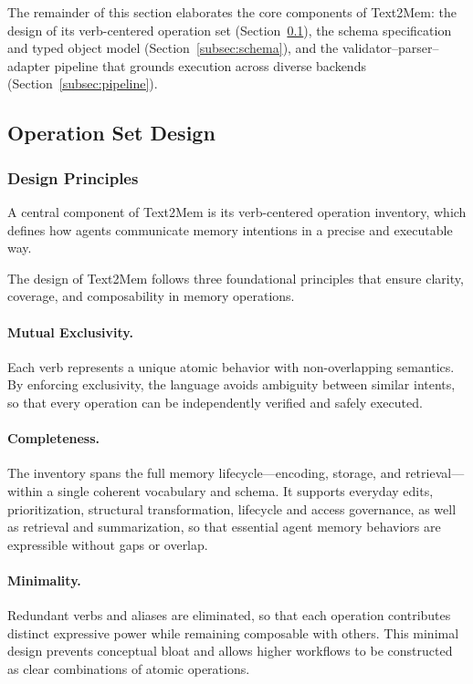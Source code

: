 \documentclass[conference]{IEEEtran}
\begin{document}
The remainder of this section elaborates the core components of Text2Mem: the design of its verb-centered operation set (Section~\ref{subsec:operations}), the schema specification and typed object model (Section~\ref{subsec:schema}), and the validator–parser–adapter pipeline that grounds execution across diverse backends (Section~\ref{subsec:pipeline}). 

\subsection{Operation Set Design}
\label{subsec:operations}

\subsubsection{\textbf{Design Principles}}
\label{subsubsec:ops-principles}

A central component of Text2Mem is its verb-centered operation inventory, which defines how agents communicate memory intentions in a precise and executable way.  

The design of Text2Mem follows three foundational principles that ensure clarity, coverage, and composability in memory operations.  

\paragraph{Mutual Exclusivity.}  
Each verb represents a unique atomic behavior with non-overlapping semantics.  
By enforcing exclusivity, the language avoids ambiguity between similar intents, so that every operation can be independently verified and safely executed.  

\paragraph{Completeness.}
The inventory spans the full memory lifecycle—encoding, storage, and retrieval—within a single coherent vocabulary and schema. 
It supports everyday edits, prioritization, structural transformation, lifecycle and access governance, as well as retrieval and summarization, so that essential agent memory behaviors are expressible without gaps or overlap.

\paragraph{Minimality.}  
Redundant verbs and aliases are eliminated, so that each operation contributes distinct expressive power while remaining composable with others.  
This minimal design prevents conceptual bloat and allows higher workflows to be constructed as clear combinations of atomic operations.  
\end{document}
